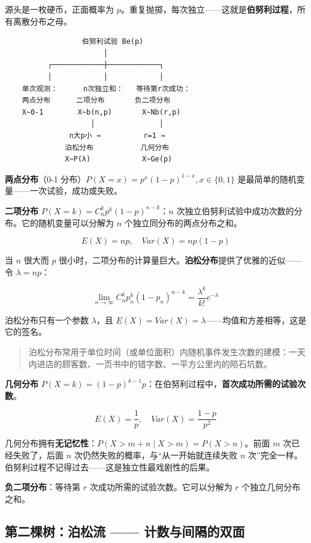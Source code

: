 \documentclass[
]{book}
\begin{document}
源头是一枚硬币，正面概率为 \(p\)。重复抛掷，每次独立------这就是\textbf{伯努利过程}，所有离散分布之母。

\begin{verbatim}
                  伯努利试验 Be(p)
                       │
          ┌────────────┼────────────┐
          │            │            │
    单次观测：      n次独立和：   等待第r次成功：
    两点分布      二项分布       负二项分布
    X~0-1        X~b(n,p)       X~Nb(r,p)
                    │               │
               n大p小 →          r=1 →
              泊松分布           几何分布
              X~P(λ)            X~Ge(p)
\end{verbatim}

\textbf{两点分布}（0-1 分布）\(P(X=x) = p^x(1-p)^{1-x}, x \in \{0,1\}\) 是最简单的随机变量------一次试验，成功或失败。

\textbf{二项分布} \(P(X=k) = C_n^k p^k (1-p)^{n-k}\)：\(n\) 次独立伯努利试验中成功次数的分布。它的随机变量可以分解为 \(n\) 个独立同分布的两点分布之和。

\[
E(X) = np, \quad Var(X) = np(1-p)
\]

当 \(n\) 很大而 \(p\) 很小时，二项分布的计算量巨大。\textbf{泊松分布}提供了优雅的近似------令 \(\lambda = np\)：

\[\lim_{n \to \infty} C_n^k p_n^k (1-p_n)^{n-k} = \frac{\lambda^k}{k!} e^{-\lambda}\]

泊松分布只有一个参数 \(\lambda\)，且 \(E(X) = Var(X) = \lambda\)------均值和方差相等，这是它的签名。

\begin{quote}
泊松分布常用于单位时间（或单位面积）内随机事件发生次数的建模：一天内进店的顾客数、一页书中的错字数、一平方公里内的陨石坑数。
\end{quote}

\textbf{几何分布} \(P(X=k) = (1-p)^{k-1} p\)：在伯努利过程中，\textbf{首次成功所需的试验次数}。

\[E(X) = \frac{1}{p}, \quad Var(X) = \frac{1-p}{p^2}\]

几何分布拥有\textbf{无记忆性}：\(P(X > m+n \mid X > m) = P(X > n)\)。前面 \(m\) 次已经失败了，后面 \(n\) 次仍然失败的概率，与``从一开始就连续失败 \(n\) 次''完全一样。伯努利过程不记得过去------这是独立性最戏剧性的后果。

\textbf{负二项分布}：等待第 \(r\) 次成功所需的试验次数。它可以分解为 \(r\) 个独立几何分布之和。

\subsection{第二棵树：泊松流 ------ 计数与间隔的双面}\label{ux7b2cux4e8cux68f5ux6811ux6ccaux677eux6d41-ux8ba1ux6570ux4e0eux95f4ux9694ux7684ux53ccux9762}
\end{document}
